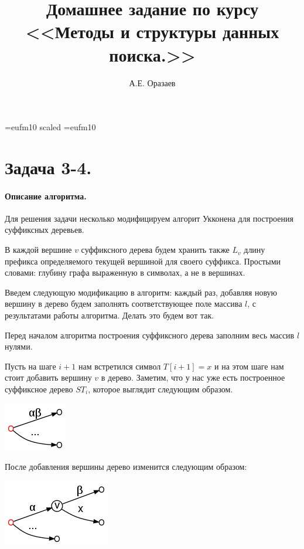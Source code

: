 \documentclass[12pt]{article}
\title{\bf Домашнее задание по курсу \\ <<Методы
и структуры данных поиска.>>}
\author{А.Е. Оразаев}
\date{}
\begin{document}
\voffset=-20mm
\hoffset=-12mm
\font\Got=eufm10 scaled \font\Got=eufm10

\maketitle

\section{Задача 3-4.}
\paragraph{Описание алгоритма.}
Для решения задачи несколько модифицируем алгорит Укконена для построения
суффиксных деревьев.

В каждой вершине $ v $ суффиксного дерева будем хранить также $ L_{v} $
длину префикса определяемого текущей вершиной для своего суффикса. Простыми
словами: глубину графа выраженную в символах, а не в вершинах.

Введем следующую модификацию в алгоритм: каждый раз, добавляя новую вершину
в дерево будем заполнять соответствующее поле массива $ l $, с результатами
работы алгоритма. Делать это будем вот так.

Перед началом алгоритма построения суффиксного дерева заполним весь массив
$ l $ нулями.

Пусть на шаге $ i + 1 $ нам встретился символ $ T[i + 1] = x $ и на
этом шаге нам стоит добавить вершину $ v $ в дерево. Заметим,
что у нас уже есть построенное суффиксное дерево $ ST_i $, которое выглядит
следующим образом.
\begin{center}
    \includegraphics[width=60bp]{before_addition.png}
\end{center}

После добавления вершины дерево изменится следующим образом:
\begin{center}
    \includegraphics[width=100bp]{after_addition.png}
\end{center}
\end{document}
